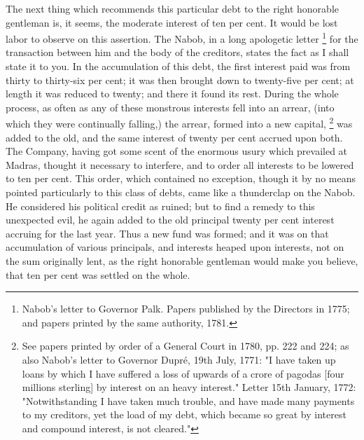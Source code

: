 The next thing which recommends this particular debt to the right honorable gentleman is, it seems, the moderate interest of ten per cent. It would be lost labor to observe on this assertion. The Nabob, in a long apologetic letter
\footnote{ Nabob's letter to Governor Palk. Papers published by the Directors in 1775; and papers printed by the same authority, 1781.}
 for the transaction between him and the body of the creditors, states the fact as I shall state it to you. In the accumulation of this debt, the first interest paid was from thirty to thirty-six per cent; it was then brought down to twenty-five per cent; at length it was reduced to twenty; and there it found its rest. During the whole process, as often as any of these monstrous interests fell into an arrear, (into which they were continually falling,) the arrear, formed into a new capital,
\footnote{ See papers printed by order of a General Court in 1780, pp. 222 and 224; as also Nabob's letter to Governor Dupré, 19th July, 1771: "I have taken up loans by which I have suffered a loss of upwards of a crore of pagodas [four millions sterling] by interest on an heavy interest." Letter 15th January, 1772: "Notwithstanding I have taken much trouble, and have made many payments to my creditors, yet the load of my debt, which became so great by interest and compound interest, is not cleared."}
 was added to the old, and the same interest of twenty per cent accrued upon both. The Company, having got some scent of the enormous usury which prevailed at Madras, thought it necessary to interfere, and to order all interests to be lowered to ten per cent. This order, which contained no exception, though it by no means pointed particularly to this class of debts, came like a thunderclap on the Nabob. He considered his political credit as ruined; but to find a remedy to this unexpected evil, he again added to the old principal twenty per cent interest accruing for the last year. Thus a new fund was formed; and it was on that accumulation of various principals, and interests heaped upon interests, not on the sum originally lent, as the right honorable gentleman would make you believe, that ten per cent was settled on the whole.

